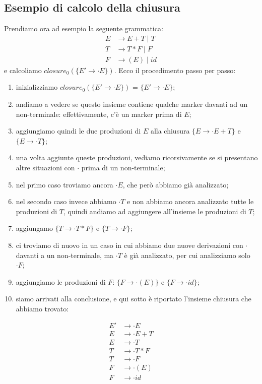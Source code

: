 \documentclass[class=book, crop=false, oneside, 12pt]{standalone}
\begin{document}
\subsection{Esempio di calcolo della chiusura}
Prendiamo ora ad esempio la seguente grammatica:
\begin{align*}
    E &\to E+T \mid T\\
    T &\to T*F \mid F\\
    F &\to (E) \mid id
\end{align*}
e calcoliamo \(closure_0(\{E' \to \cdot E\})\). Ecco il procedimento passo per passo:
\begin{enumerate}
    \item inizializziamo \(closure_0(\{E' \to \cdot E\})\) = \(\{E' \to \cdot E\}\); 
    \item andiamo a vedere se questo insieme contiene qualche marker davanti ad un non-terminale: effettivamente, c'è un marker prima di \(E\);
    \item aggiungiamo quindi le due produzioni di \(E\) alla chiusura \(\{E \to \cdot E+T\}\) e \(\{E \to \cdot T\}\);
    \item una volta aggiunte queste produzioni, vediamo ricorsivamente se si presentano altre situazioni con \(\cdot\) prima di un non-terminale;
    \item nel primo caso troviamo ancora \(\cdot E\), che però abbiamo già analizzato;
    \item nel secondo caso invece abbiamo \(\cdot T\) e non abbiamo ancora analizzato tutte le produzioni di \(T\), quindi andiamo ad aggiungere all'insieme le produzioni di \(T\);
    \item aggiungamo \(\{T \to \cdot T * F\}\) e \(\{T \to \cdot F\}\);
    \item ci troviamo di nuovo in un caso in cui abbiamo due nuove derivazioni con \(\cdot\) davanti
    a un non-terminale, ma \(\cdot T\) è già analizzato, per cui analizziamo solo \(\cdot F\);
    \item aggiungiamo le produzioni di \(F\): \(\{F \to \cdot (E)\}\) e \(\{F \to \cdot id \}\);
    \item siamo arrivati alla conclusione, e qui sotto è riportato l'insieme chiusura che abbiamo trovato:
\end{enumerate}
\begin{align*}
    E' &\to \cdot E \\
    E  &\to \cdot E+T \\
    E  &\to \cdot T \\
    T  &\to \cdot T * F \\
    T  &\to \cdot F \\
    F  &\to \cdot (E) \\
    F  &\to \cdot id
\end{align*}
\end{document}
